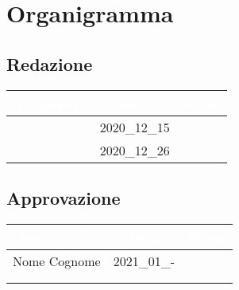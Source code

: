 \section{Organigramma}
\label{organigramma}

\subsection{Redazione}
\begin{table}[H]
	\begin{center}
		\begin{tabular}{|c c c|}
			\rowcolor{darkblue}
			\textcolor{white}{Nominativo} 	& \textcolor{white}{Data} 	& \textcolor{white}{Firma} \\ \hline
							\MM 			&		2020\_12\_15		& \\ \hline
							\PC				&		2020\_12\_26		& \\ \hline
		\end{tabular}
	\end{center}
\end{table}

\subsection{Approvazione}
\begin{table}[H]
	\begin{center}
		\begin{tabular}{|c c c|}
			\rowcolor{darkblue}
			\textcolor{white}{Nominativo} 	& \textcolor{white}{Data} 	& \textcolor{white}{Firma} \\ \hline
							Nome Cognome	&		2021\_01\_-			& \\ \hline
							\VT 			&							& \\ \hline
							\CR				&							& \\ \hline
		\end{tabular}
	\end{center}
\end{table}

